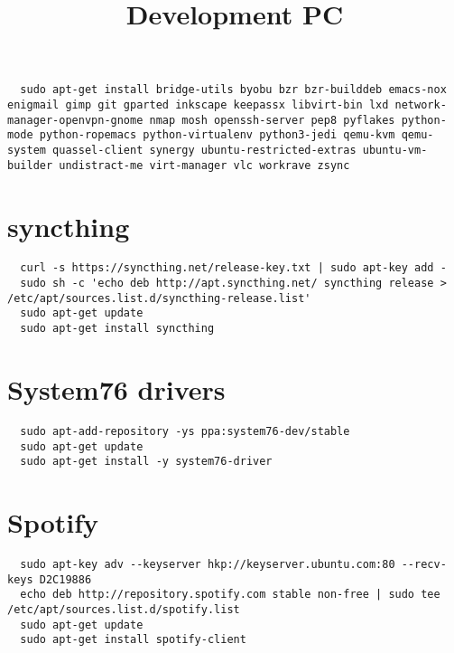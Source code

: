 \documentclass[12pt]{article}
\title{Development PC}
\begin{document}
\begin{verbatim}
  sudo apt-get install bridge-utils byobu bzr bzr-builddeb emacs-nox enigmail gimp git gparted inkscape keepassx libvirt-bin lxd network-manager-openvpn-gnome nmap mosh openssh-server pep8 pyflakes python-mode python-ropemacs python-virtualenv python3-jedi qemu-kvm qemu-system quassel-client synergy ubuntu-restricted-extras ubuntu-vm-builder undistract-me virt-manager vlc workrave zsync
\end{verbatim}

\section{syncthing}

\begin{verbatim}
  curl -s https://syncthing.net/release-key.txt | sudo apt-key add -
  sudo sh -c 'echo deb http://apt.syncthing.net/ syncthing release > /etc/apt/sources.list.d/syncthing-release.list'
  sudo apt-get update
  sudo apt-get install syncthing
\end{verbatim}

\section{System76 drivers}

\begin{verbatim}
  sudo apt-add-repository -ys ppa:system76-dev/stable
  sudo apt-get update
  sudo apt-get install -y system76-driver
\end{verbatim}

\section{Spotify}

\begin{verbatim}
  sudo apt-key adv --keyserver hkp://keyserver.ubuntu.com:80 --recv-keys D2C19886
  echo deb http://repository.spotify.com stable non-free | sudo tee /etc/apt/sources.list.d/spotify.list
  sudo apt-get update
  sudo apt-get install spotify-client
\end{verbatim}
\end{document}
